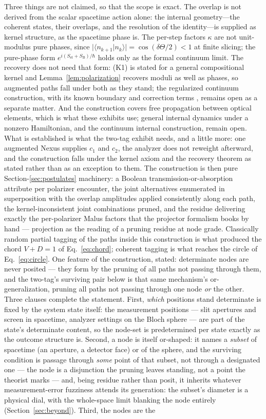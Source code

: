 Three things are not claimed, so that the scope is exact. The overlap is not derived from the scalar spacetime action alone: the internal geometry---the coherent states, their overlaps, and the resolution of the identity---is supplied as kernel structure, as the spacetime phase is. The per-step factors $\kappa$ are not unit-modulus pure phases, since $\vert\langle n_{k+1} \vert n_k \rangle\vert = \cos(\delta\Theta/2) < 1$ at finite slicing; the pure-phase form $e^{i(S_{\mathrm{st}} + S_{\mathrm{B}})/\hbar}$ holds only as the formal continuum limit. The recovery does not need that form: (K1) is stated for a general compositional kernel and Lemma~\ref{lem:polarization} recovers moduli as well as phases, so augmented paths fall under both as they stand; the regularized continuum construction, with its known boundary and correction terms \cite{Kochetov1995}, remains open as a separate matter. And the construction covers free propagation between optical elements, which is what these exhibits use; general internal dynamics under a nonzero Hamiltonian, and the continuum internal construction, remain open. What is established is what the two-tag exhibit needs, and a little more: one augmented Nexus supplies $c_1$ and $c_2$, the analyzer does not reweight afterward, and the construction falls under the kernel axiom and the recovery theorem as stated rather than as an exception to them. The construction is then pure Section-\ref{sec:postulates} machinery: a Boolean transmission-or-absorption attribute per polarizer encounter, the joint alternatives enumerated in superposition with the overlap amplitudes applied consistently along each path, the kernel-inconsistent joint combinations pruned, and the residue delivering exactly the per-polarizer Malus factors that the projector formalism books by hand --- projection as the reading of a pruning residue at node grade. Classically random partial tagging of the paths inside this construction is what produced the chord $V + D = 1$ of Eq.~\eqref{eq:chord}; coherent tagging is what reaches the circle of Eq.~\eqref{eq:circle}. One feature of the construction, stated: determinate nodes are never posited --- they form by the pruning of all paths not passing through them, and the two-tag's surviving pair below is that same mechanism's or-generalization, pruning all paths not passing through one node \emph{or} the other. Three clauses complete the statement. First, \emph{which} positions stand determinate is fixed by the system state itself: the measurement positions --- slit apertures and screen in spacetime, analyzer settings on the Bloch sphere --- are part of the state's determinate content, so the node-set is predetermined per state exactly as the outcome structure is. Second, a node is itself or-shaped: it names a \emph{subset} of spacetime (an aperture, a detector face) or of the sphere, and the surviving condition is passage through \emph{some} point of that subset, not through a designated one --- the node is a disjunction the pruning leaves standing, not a point the theorist marks --- and, being residue rather than posit, it inherits whatever measurement-error fuzziness attends its generation: the subset's diameter is a physical dial, with the whole-space limit blanking the node entirely (Section~\ref{sec:beyond}). Third, the nodes are the 